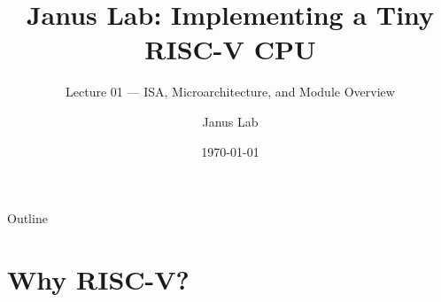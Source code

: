 \documentclass[aspectratio=169,10pt]{beamer}
\title[Janus Lab -- CPU Intro]{Janus Lab: Implementing a Tiny RISC-V CPU}
\subtitle{Lecture 01 --- ISA, Microarchitecture, and Module Overview}
\author{Janus Lab}
\date{\today}
\institute{CPU Design and Implementation}
\begin{document}

\begin{frame}
  \titlepage
\end{frame}

\begin{frame}{Outline}
  \tableofcontents
\end{frame}

\section{Why RISC-V?}
\end{document}
